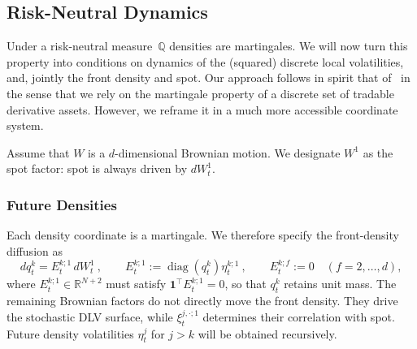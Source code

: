 \documentclass[11pt]{article}
\newcommand{\Q}{\mathbb Q}
\newcommand{\one}{\mathbf 1}
\theoremstyle{plain}
\theoremstyle{definition}
\theoremstyle{remark}
\begin{document}
  \subsection{Risk-Neutral Dynamics}

Under a risk-neutral measure~$\Q$ densities are martingales. We will now turn this property into conditions on dynamics of the (squared) discrete local volatilities, and, 
jointly the front density and spot. 
      Our approach follows in spirit that of~\cite{Wissel2007} in the sense that we rely on the martingale property of a discrete set of tradable derivative assets.
      However, we reframe it in a much more accessible coordinate system.

Assume that $W$ is a $d$-dimensional Brownian motion. We designate $W^1$ as the
      spot factor: spot is always driven by $dW_t^1$.


      \subsubsection{Future Densities}
  \label{sec:future-densities}

       Each density coordinate
      is a martingale. We therefore specify the front-density diffusion as
      \[
        dq_t^k=E_t^{k;1}\,dW_t^1 \ ,
        \qquad
        E_t^{k;1}:=\operatorname{diag}(q_t^k)\eta_t^{k;1} \ ,
        \qquad E_t^{k;f}:=0\quad(f=2,\ldots,d),
      \]
      where $E_t^{k;1}\in\mathbb R^{N+2}$ must satisfy
      $\one^{\!\top}E_t^{k;1}=0$, so that $q_t^k$ retains unit mass. The
      remaining Brownian factors do not directly move the front density. They
      drive the stochastic DLV surface, while $\xi_t^{j,\cdot;1}$ determines their correlation with spot.
      Future density volatilities $\eta_t^j$ for $j>k$ will be obtained recursively.
\end{document}
